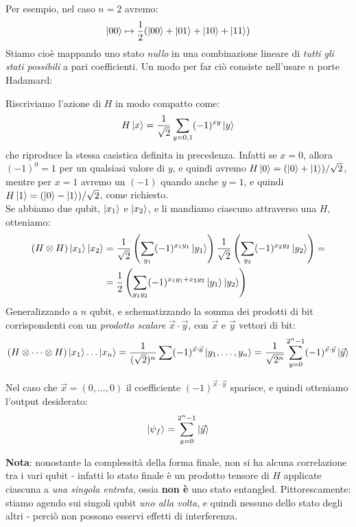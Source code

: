 \documentclass[../../InformazioneQuantistica.tex]{subfiles}
\begin{document}
Per esempio, nel caso $n=2$ avremo:
\begin{align*}
\Ket{00} \mapsto \frac{1}{2}(\Ket{00}+\Ket{01}+\Ket{10}+\Ket{11})
\end{align*}
Stiamo cioè mappando uno stato \textit{nullo} in una combinazione lineare di \textit{tutti gli stati possibili} a pari coefficienti. Un modo per far ciò consiste nell'usare $n$ porte Hadamard:



Riscriviamo l'azione di $H$ in modo compatto come:
\begin{align*}
H\Ket{x} = \frac{1}{\sqrt{2}} \sum_{y=0,1} (-1)^{xy} \Ket{y}
\end{align*}
che riproduce la stessa casistica definita in precedenza. Infatti se $x = 0$, allora $(-1)^0=1$ per un qualsiasi valore di $y$, e quindi avremo $H\Ket{0} = (\Ket{0}+\Ket{1})/\sqrt{2}$, mentre per $x=1$ avremo un $(-1)$ quando anche $y=1$, e quindi $H\Ket{1}=(\Ket{0}-\Ket{1})/\sqrt{2}$, come richiesto.\\

Se abbiamo due qubit, $\Ket{x_1}$ e $\Ket{x_2}$, e li mandiamo ciascuno attraverso una $H$, otteniamo:
\begin{align*}
(H\otimes H)\Ket{x_1} \Ket{x_2} &= \frac{1}{\sqrt{2}}\left(\sum_{y_1} (-1)^{x_1 y_1} \Ket{y_1}\right)\frac{1}{\sqrt{2}}\left(\sum_{y_2}(-1)^{x_2y_2}\Ket{y_2}\right)=\\
&=\frac{1}{2} \left(\sum_{y_1 y_2} (-1)^{x_1 y_1 + x_2y_2} \Ket{y_1}\Ket{y_2}\right)
\end{align*}
Generalizzando a $n$ qubit, e schematizzando la somma dei prodotti di bit corrispondenti con un \textit{prodotto scalare} $\vec{x}\cdot \vec{y}$, con $\vec{x}$ e $\vec{y}$ vettori di bit:
\begin{align*}
(H\otimes \dots \otimes H) \Ket{x_1}\dots \Ket{x_n} = \frac{1}{(\sqrt{2})^n} \sum (-1)^{\vec{x}\cdot \vec{y}}\Ket{y_1, \dots, y_n} = \frac{1}{\sqrt{2^n}} \sum_{y=0}^{2^n-1} (-1)^{\vec{x}\cdot\vec{y}} \Ket{\vec{y}}
\end{align*}

Nel caso che $\vec{x}=(0,\dots,0)$  il coefficiente $(-1)^{\vec{x}\cdot \vec{y}}$ sparisce, e quindi otteniamo l'output desiderato:
\begin{align*}
\Ket{\psi_{f}}=\sum_{y=0}^{2^n-1} \Ket{\vec{y}}
\end{align*}

\textbf{Nota}: nonostante la complessità della forma finale, non si ha alcuna correlazione tra i vari qubit - infatti lo stato finale è un prodotto tensore di $H$ applicate ciascuna a \textit{una singola entrata}, ossia \textbf{non è} uno stato entangled. Pittorescamente: stiamo agendo sui singoli qubit \textit{uno alla volta}, e quindi nessuno  dello stato degli altri - perciò non possono esservi effetti di interferenza.
\end{document}
